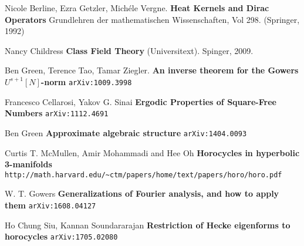 \documentclass[12pt]{article}
\begin{document}
\begin{thebibliography}{}

\item Nicole Berline, Ezra Getzler, Mich\'{e}le Vergne. \textbf{Heat Kernels and Dirac Operators} Grundlehren der mathematischen Wissenschaften, Vol 298. (Springer, 1992)

\item Nancy Childress \textbf{Class Field Theory} (Universitext).  Spinger, 2009.

\item Ben Green, Terence Tao, Tamar Ziegler. \textbf{An inverse theorem for the Gowers $U^{s+1}[N]$-norm} \texttt{arXiv:1009.3998}

\item Francesco Cellarosi, Yakov G. Sinai \textbf{Ergodic Properties of Square-Free Numbers} \texttt{arXiv:1112.4691}

\item Ben Green \textbf{Approximate algebraic structure} \texttt{arXiv:1404.0093}

\item Curtis T. McMullen, Amir Mohammadi and Hee Oh \textbf{Horocycles in hyperbolic 3-manifolds} \texttt{http://math.harvard.edu/\~{}ctm/papers/home/text/papers/horo/horo.pdf}

\item W. T. Gowers \textbf{Generalizations of Fourier analysis, and how to apply them} \texttt{arXiv:1608.04127}

\item Ho Chung Siu, Kannan Soundararajan \textbf{Restriction of Hecke eigenforms to horocycles} \texttt{arXiv:1705.02080}

\end{thebibliography}

\end{document}
